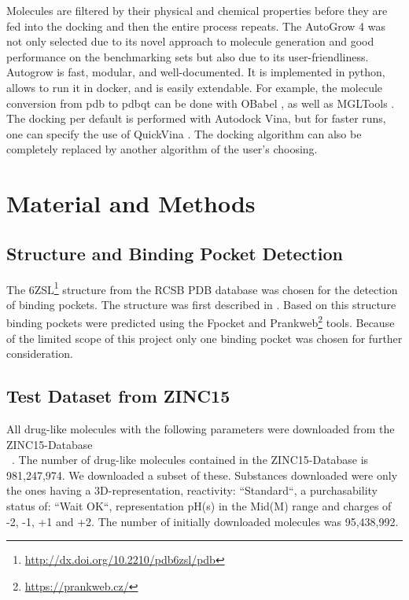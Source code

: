 \documentclass[11pt, letterpaper, titlepage]{article}
\begin{document}
\newline \newline
Molecules are filtered by their physical and chemical properties before they are fed into the docking and then the entire process repeats.
\newline \newline
The AutoGrow 4 was not only selected due to its novel approach to molecule generation and good performance on the benchmarking sets but also due to its user-friendliness. Autogrow is fast, modular, and well-documented. It is implemented in python, allows to run it in docker, and is easily extendable. For example, the molecule conversion from pdb to pdbqt can be done with OBabel \cite{o2011open}, as well as MGLTools \cite{mgtools}. The docking per default is performed with Autodock Vina, but for faster runs, one can specify the use of QuickVina \cite{handoko2012quickvina}. The docking algorithm can also be completely replaced by another algorithm of the user’s choosing. 

\section{Material and Methods} 

 

\subsection{Structure and Binding Pocket Detection}

\label{structure_and_binding_pocket}

The 6ZSL\footnote{\url{http://dx.doi.org/10.2210/pdb6zsl/pdb}} structure from the RCSB PDB database was chosen for the detection of binding pockets. The structure was first described in \cite{Newman2021}. 
\newline \newline
Based on this structure binding pockets were predicted using the Fpocket \cite{LeGuilloux2009} and Prankweb\footnote{\url{https://prankweb.cz/}} \cite{Jendele2019} tools. Because of the limited scope of this project only one binding pocket was chosen for further consideration.

 

\subsection{Test Dataset from ZINC15} 

All drug-like molecules with the following parameters were downloaded from the ZINC15-Database \\~\cite{Sterling2015}. The number of drug-like molecules contained in the ZINC15-Database is 981,247,974. We downloaded a subset of these. Substances downloaded were only the ones having a 3D-representation, reactivity: ``Standard``, a purchasability status of: ``Wait OK``, representation pH(s) in the Mid(M) range and charges of -2, -1, +1 and +2. The number of initially downloaded molecules was 95,438,992. 
\end{document}
